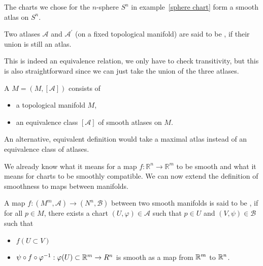 \documentclass[a4paper,12pt]{article}
\begin{document}
\begin{example}
    The charts we chose for the \(n\)-sphere \(S^n\) in example\ \ref{sphere chart} form a smooth atlas on \(S^n\).
\end{example}

\begin{definition}\label{equivalence atlas}
    Two atlases \(\mathcal{A}\) and \(\mathcal{A}^\prime\) (on a fixed topological manifold) are said to be , if their union is still an atlas.
\end{definition}

\begin{remark}
    This is indeed an equivalence relation, we only have to check transitivity, but this is also straightforward since we can just take the union of the three atlases.
\end{remark}


\begin{definition}
    A  \(M=(M,[\mathcal{A}])\) consists of
    \begin{itemize}
        \item a topological manifold \(M\),
        \item an equivalence class \([\mathcal{A}]\) of smooth atlases on \(M\).
    \end{itemize}
\end{definition}

\begin{remark}
    An alternative, equivalent definition would take a maximal atlas instead of an equivalence class of atlases.
\end{remark}

We already know what it means for a map \(f:\mathbb{R}^n\to\mathbb{R}^m\) to be smooth and what it means for charts to be smoothly compatible. We can now extend the definition of smoothness to maps between manifolds.

\begin{definition}
    A map \(f:(M^m,\mathcal{A})\to (N^n,\mathcal{B})\) between two smooth manifolds is said to be , if for all \(p\in M\), there exists a chart \((U,\varphi)\in\mathcal{A}\) such that \(p\in U\) and \((V,\psi)\in\mathcal{B}\) such that
    \begin{itemize}
        \item \(f(U\subset V)\)
        \item \(\psi\circ f\circ \varphi^{-1}:\varphi(U)\subset \mathbb{R}^m\to R^n\) is smooth as a map from \(\mathbb{R}^m\) to \(\mathbb{R}^n\).
    \end{itemize}
\end{definition}
\end{document}
